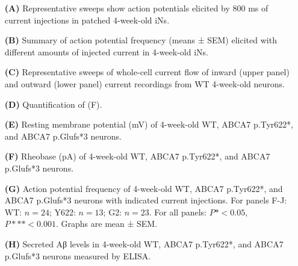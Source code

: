 \begin{itemize}
    \item[\textbf{(A)}] Representative sweeps show action potentials elicited by 800 ms of current injections in patched 4-week-old iNs.
    \item[\textbf{(B)}] Summary of action potential frequency (means ± SEM) elicited with different amounts of injected current in 4-week-old iNs. 
    \item[\textbf{(C)}] Representative sweeps of whole-cell current flow of inward (upper panel) and outward (lower panel) current recordings from WT 4-week-old neurons. 
    \item[\textbf{(D)}] Quantification of (F). 
    \item[\textbf{(E)}] Resting membrane potential (mV) of 4-week-old WT, ABCA7 p.Tyr622*, and ABCA7 p.Glufs*3 neurons. 
    \item[\textbf{(F)}] Rheobase (pA) of 4-week-old WT, ABCA7 p.Tyr622*, and ABCA7 p.Glufs*3 neurons. 
    \item[\textbf{(G)}] Action potential frequency of 4-week-old WT, ABCA7 p.Tyr622*, and ABCA7 p.Glufs*3 neurons with indicated current injections. For panels F-J: WT: $n=24$; Y622: $n=13$; G2: $n=23$. For all panels: $P*<0.05$, $P***<0.001$. Graphs are mean ± SEM.
    \item[\textbf{(H)}] Secreted Aβ levels in 4-week-old WT, ABCA7 p.Tyr622*, and ABCA7 p.Glufs*3 neurons measured by ELISA. 
\end{itemize}